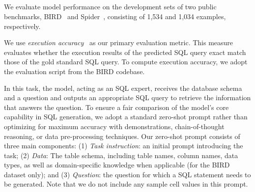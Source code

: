 \subsection{\texttosql}
\label{sec:exp_text2sql}

We evaluate model performance on the development sets of two public benchmarks, BIRD~\citep{bird} and Spider~\citep{yu-etal-2018-spider}, consisting of 1,534 and 1,034 examples, respectively.

We use \textit{execution accuracy}~\cite{bird} as our primary evaluation metric. This measure evaluates whether the execution results of the predicted SQL query exact match those of the gold standard SQL query.  To compute execution accuracy, we adopt the evaluation script from the BIRD codebase.

  In this task, the model, acting as an SQL expert, receives the database schema and a question and outputs an appropriate SQL query to retrieve the information that answers the question.
To ensure a fair comparison of the model’s core capability in SQL generation, we adopt a standard zero-shot \texttosql prompt rather than optimizing for maximum accuracy with demonstrations, chain-of-thought reasoning, or data pre-processing techniques. Our zero-shot prompt consists of three main components: 
(1) \textit{Task instruction}: an initial prompt introducing the \texttosql task; 
(2) \textit{Data}: The table schema, including table names, column names, data types, as well as domain-specific knowledge when applicable (for the BIRD dataset only); 
and (3) \textit{Question}: the question for which a SQL statement needs to be generated. Note that we do not include any sample cell values in this prompt.



